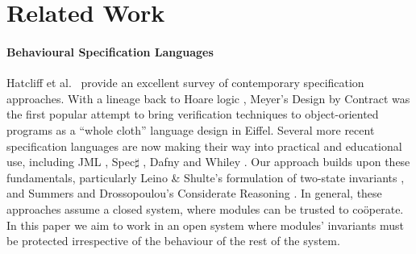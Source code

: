 \section{Related Work} 


\paragraph{Behavioural Specification Languages} 

Hatcliff et al.\ \cite{behavSurvey2012} provide an excellent survey of
contemporary specification approaches.  With a lineage back to Hoare
logic \cite{Hoare69}, Meyer's Design by Contract \cite{Meyer97} was the
first popular attempt to bring verification techniques to
object-oriented programs as a ``whole cloth'' language design in
Eiffel.  Several more recent specification languages are now making
their way into practical and educational use, including JML
\cite{Leavens-etal07}, Spec$\sharp$ \cite{BarLeiSch05}, Dafny
\cite{dafny} and Whiley \cite{whiley15}. Our approach builds upon
these fundamentals, particularly Leino \& Shulte's
formulation of
two-state invariants \cite{usingHistory}, and Summers and
Drossopoulou's Considerate Reasoning \cite{Considerate}.
%
In general, these approaches assume a closed system, where modules
can be trusted to co{\"o}perate. In this paper we aim to
work
in an open system where modules'
invariants must be protected irrespective of the behaviour of the rest
of the system.



